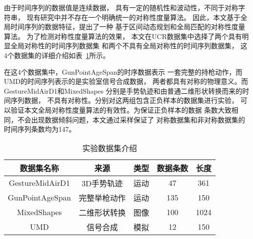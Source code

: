由于时间序列的数据值是连续数据，
具有一定的随机性和波动性，不同于对称字符串，
现有研究中并不存在一个明确统一的对称性度量算法。
因此，本文基于全局时间序列的数据特征，提出了一种
基于区间动态规划和全局匹配的对称性度量算法。
为了检测对称性度量算法的效果，
本文在UCR数据集中选择了两个具有明显全局对称性的时间序列数据集
和两个不具有全局对称性的时间序列数据集，
这4个数据集的详细介绍如表~\ref{tab:experiment_dataset}所示。

在这4个数据集中，GunPointAgeSpan的时序数据表示
一套完整的持枪动作，而UMD的时间序列表示的是实验室信号合成数据，
两者都具有对称的物理意义。而GestureMidAirD1和MixedShapes
分别是手势轨迹和由普通二维形状转换而来的时间序列数据，
不具有对称性。分别对这两组包含正负样本的数据集进行实验，
可以验证本文全局对称性度量算法的有效性。为保证正负样本的数据
条数大致相同，不会出现数据倾斜问题，本文通过采样保证了
对称数据集和非对称数据集的时间序列条数均为147。

\begin{table}
  \centering
  \caption{实验数据集介绍}
  \begin{tabular}{ccccc}
    \toprule
    数据集名称      & 来源         & 类型 & 数据条数 & 长度 \\
    \midrule
    GestureMidAirD1 & 3D手势轨迹   & 运动 & 47       & 361  \\
    GunPointAgeSpan & 完整举枪动作 & 运动 & 135      & 150  \\
    MixedShapes     & 二维形状转换 & 图像 & 100      & 1024 \\
    UMD             & 信号合成     & 模拟 & 12       & 150  \\
    \bottomrule
  \end{tabular}
  \label{tab:experiment_dataset}
\end{table}

